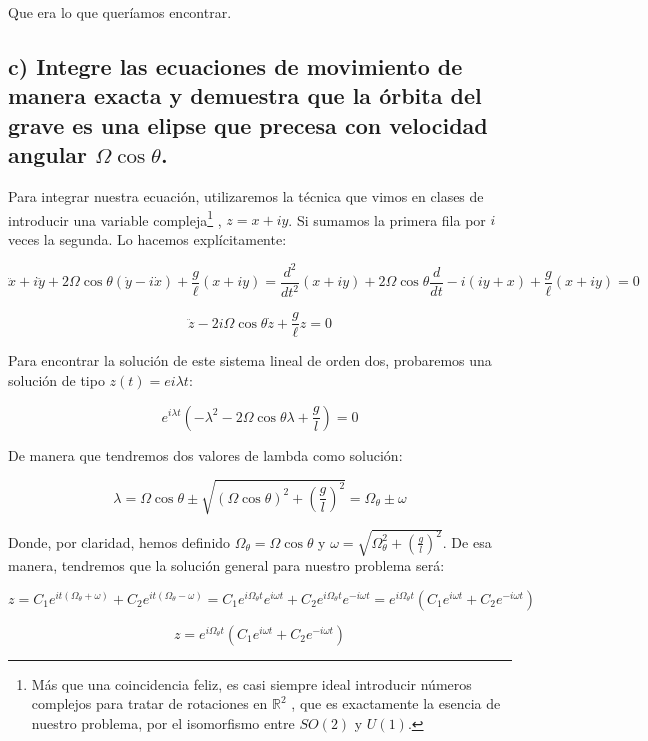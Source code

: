 \documentclass[a4paper,12pt]{article}
\begin{document}
Que era lo que queríamos encontrar.

\subsection*{c) Integre las ecuaciones de movimiento de manera exacta y demuestra que la órbita del grave es una elipse que precesa con velocidad angular $\Omega \cos\theta$.}

Para integrar nuestra ecuación, utilizaremos la técnica que vimos en clases de introducir una variable  compleja\footnote{Más que una coincidencia feliz, es casi siempre ideal introducir números complejos para tratar de rotaciones en $\mathbb{R}^{2}$ , que es exactamente la esencia de nuestro problema, por el isomorfismo entre $SO(2)$ y $U(1)$.} , $z = x + i y $. Si sumamos la primera fila por $i$ veces la segunda. Lo hacemos explícitamente:

$$\ddot{x} + i\ddot{y} + 2\Omega \cos\theta(\dot{y} -i \dot{x}) + \frac{g}{\ell} (x + i y) =\frac{d^2}{dt^2} \left(x + i y\right) + 2\Omega \cos\theta\frac{d}{dt}-i (iy + x) + \frac{g}{\ell} (x + i y) = 0 $$

$$\ddot{z} - 2i\Omega\cos\theta \dot{z} + \frac{g}{\ell} z = 0$$

Para encontrar la solución de este sistema lineal de orden dos, probaremos una solución de tipo $z(t) = e{i\lambda t}$:

$$e^{i\lambda t} (-\lambda^2 - 2\Omega \cos{\theta} \lambda + \frac{g}{l}) = 0$$

De manera que tendremos dos valores de lambda como solución:

$$\lambda = \Omega \cos\theta \pm \sqrt{(\Omega\cos\theta)^2 + \left(\frac{g}{l}\right)^2} = \Omega_\theta \pm \omega$$

Donde, por claridad, hemos definido $\Omega_\theta = \Omega \cos\theta$ y $\omega = \sqrt{\Omega_\theta^2 + \left(\frac{g}{l}\right)^2}$. De esa manera, tendremos que la solución general para nuestro problema será:

$$z = C_1 e^{it(\Omega_\theta + \omega)} +C_2 e^{it(\Omega_\theta - \omega)} = C_1 e^{i\Omega_\theta t} e^{i\omega t} + C_2 e^{i \Omega_\theta t} e^{-i\omega t} = e^{i\Omega_\theta t}\left(C_1 e^{i\omega t} + C_2 e^{-i\omega t}\right) $$

\begin{equation}
  \label{sol1}
  z = e^{i\Omega_\theta t}\left(C_1 e^{i\omega t} + C_2 e^{-i\omega t}\right) 
\end{equation}
\end{document}
